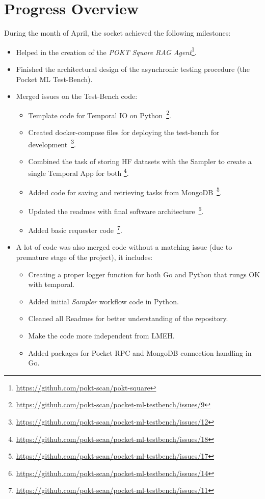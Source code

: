 \section{Progress Overview}\label{sec:a}

During the month of April, the socket achieved the following milestones:

\begin{itemize}
    \item Helped in the creation of the \emph{POKT Square RAG Agent}\footnote{\url{https://github.com/pokt-scan/pokt-square}}.
    \item Finished the architectural design of the asynchronic testing procedure (the Pocket \gls{ML} Test-Bench).
    \item Merged issues on the Test-Bench code:
    \begin{itemize}
        \item Template code for Temporal IO on Python~\footnote{\url{https://github.com/pokt-scan/pocket-ml-testbench/issues/9}}.
        \item Created docker-compose files for deploying the test-bench for development~\footnote{\url{https://github.com/pokt-scan/pocket-ml-testbench/issues/12}}.
        \item Combined the task of storing \gls{HF} datasets with the Sampler to create a single Temporal App for both \footnote{\url{https://github.com/pokt-scan/pocket-ml-testbench/issues/18}}.
        \item Added code for saving and retrieving tasks from MongoDB~\footnote{\url{https://github.com/pokt-scan/pocket-ml-testbench/issues/17}}.
        \item Updated the readmes with final software architecture~\footnote{\url{https://github.com/pokt-scan/pocket-ml-testbench/issues/14}}.
        \item Added basic requester code~\footnote{\url{https://github.com/pokt-scan/pocket-ml-testbench/issues/11}}.
    \end{itemize}
    \item A lot of code was also merged code without a matching issue (due to premature stage of the project), it includes:
    \begin{itemize}
        \item Creating a proper logger function for both Go and Python that rungs OK with temporal.
        \item Added initial \emph{Sampler} workflow code in Python.
        \item Cleaned all Readmes for better understanding of the repository.
        \item Make the code more independent from \gls{LMEH}.
        \item Added packages for Pocket RPC and MongoDB connection handling in Go.
    \end{itemize}
\end{itemize}
